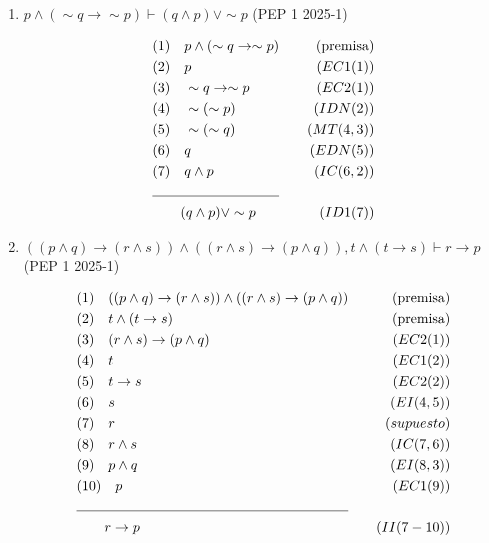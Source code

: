 \documentclass{article}
\begin{document}
\begin{enumerate}
  \newpage

  \item $p \land (\sim q \rightarrow \sim p) \vdash (q \land p) \vee \sim p$
        \quad (PEP 1 2025-1)

        \begin{align*}
          &(1) \quad p \land (\sim q \rightarrow \sim p)  & \quad (\text{premisa}) \\
          &(2) \quad p & \quad (EC1(1)) \\
          &(3) \quad \sim q \rightarrow \sim p & \quad (EC2(1)) \\
          &(4) \quad \sim (\sim p) & \quad (IDN(2)) \\
          &(5) \quad \sim (\sim q) & \quad (MT(4, 3)) \\
          &(6) \quad q & \quad (EDN(5)) \\
          &(7) \quad q \land p & \quad (IC(6, 2))\\
          \cline{1-2}
          & \qquad (q \land p) \vee \sim p & \quad (ID1(7))
        \end{align*}


  \item
        $((p \land q) \rightarrow (r \land s)) \land ((r \land s) \rightarrow (p \land q)), t \land (t \rightarrow s) \vdash r \rightarrow p$
        \quad (PEP 1 2025-1)

        \begin{align*}
          &(1) \quad ((p \land q) \rightarrow (r \land s)) \land ((r \land s) \rightarrow (p \land q))  & \quad (\text{premisa}) \\
          &(2) \quad t \land (t \rightarrow s) & \quad (\text{premisa}) \\
          &(3) \quad (r \land s) \rightarrow (p \land q) & \quad (EC2(1)) \\
          &(4) \quad t & \quad (EC1(2)) \\
          &(5) \quad t \rightarrow s & \quad (EC2(2)) \\
          &(6) \quad s & \quad (EI(4, 5)) \\
          &(7) \quad r & \quad (supuesto) \\
          &(8) \quad r \land s & \quad (IC(7, 6)) \\
          &(9) \quad p \land q & \quad (EI(8, 3)) \\
          &(10) \quad p & \quad (EC1(9)) \\
          \cline{1-2}
          & \qquad r \rightarrow p & \quad (II(7-10))
        \end{align*}




\end{enumerate}
\end{document}
